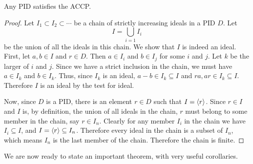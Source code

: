 \begin{lemma}\label{lemma-pid-satisfies-accp}
    Any PID satisfies the ACCP.
\end{lemma}
\begin{proof}
    Let $I_1 \subset I_2 \subset \cdots$ be a chain of strictly increasing ideals in a PID $D$. Let
    \[
        I = \bigcup_{i=1} I_i
    \]
    be the union of all the ideals in this chain. We show that $I$ is indeed an ideal. First, let $a,b\in I$ and $r \in D$. Then $a \in I_i$ and $b \in I_j$ for some $i$ and $j$. Let $k$ be the larger of $i$ and $j$. Since we have a strict inclusion in the chain, we must have $a \in I_k$ and $b \in I_k$. Thus, since $I_k$ is an ideal, $a - b \in I_k \subseteq I$ and $ra, ar \in I_k \subseteq I$. Therefore $I$ is an ideal by the test for ideal.

    Now, since $D$ is a PID, there is an element $r \in D$ such that $I = \left\langle r\right\rangle$. Since $r \in I$ and $I$ is, by definition, the union of all ideals in the chain, $r$ must belong to some member in the chain, say $r \in I_n$. Clearly for any member $I_i$ in the chain we have $I_i \subseteq I$, and $I = \left\langle r\right\rangle \subseteq I_n$. Therefore every ideal in the chain is a subset of $I_n$, which means $I_n$ is the last member of the chain. Therefore the chain is finite.
\end{proof}

We are now ready to state an important theorem, with very useful corollaries.

